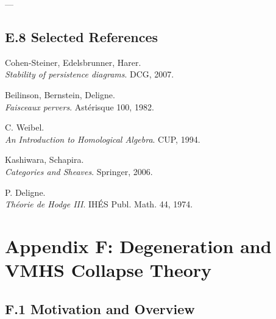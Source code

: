 \documentclass[11pt]{article}
\begin{document}
\begin{center}
\end{center}

---

\subsection*{E.8 Selected References}

\begin{thebibliography}{9}

Cohen-Steiner, Edelsbrunner, Harer.\\
\textit{Stability of persistence diagrams}. DCG, 2007.

Beilinson, Bernstein, Deligne.\\
\textit{Faisceaux pervers}. Astérisque 100, 1982.

C. Weibel.\\
\textit{An Introduction to Homological Algebra}. CUP, 1994.

Kashiwara, Schapira.\\
\textit{Categories and Sheaves}. Springer, 2006.

P. Deligne.\\
\textit{Théorie de Hodge III}. IHÉS Publ. Math. 44, 1974.

\end{thebibliography}



\section*{Appendix F: Degeneration and VMHS Collapse Theory}

\subsection*{F.1 Motivation and Overview}
\end{document}
